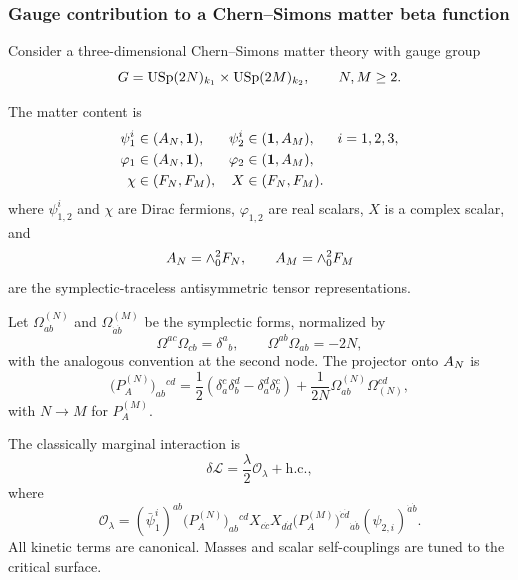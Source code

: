 \subsubsection{Gauge contribution to a Chern--Simons matter beta function}
\label{problem:chern-simons-beta-function}
Consider a three-dimensional Chern--Simons matter theory with gauge group
\begin{equation}
G=\operatorname{USp}(2N)_{k_1}\times \operatorname{USp}(2M)_{k_2},
\qquad N,M\geq 2.
\end{equation}

The matter content is
\begin{align}
\psi_1^i&\in(A_N,\mathbf{1}),
&\psi_2^i&\in(\mathbf{1},A_M),
&&i=1,2,3,\\
\varphi_1&\in(A_N,\mathbf{1}),
&\varphi_2&\in(\mathbf{1},A_M),\\
\chi&\in(F_N,F_M),
&X&\in(F_N,F_M).
\end{align}
where $\psi_{1,2}^i$ and $\chi$ are Dirac fermions, $\varphi_{1,2}$ are real scalars, $X$ is a complex scalar, and
\begin{equation}
A_N=\wedge_0^2F_N,
\qquad
A_M=\wedge_0^2F_M
\end{equation}
are the symplectic-traceless antisymmetric tensor representations.

Let $\Omega_{ab}^{(N)}$ and $\Omega_{\dot a\dot b}^{(M)}$ be the symplectic forms, normalized by
\begin{equation}
\Omega^{ac}\Omega_{cb}=\delta^a{}_b,
\qquad
\Omega^{ab}\Omega_{ab}=-2N,
\end{equation}
with the analogous convention at the second node. The projector onto $A_N$ is
\begin{equation}
\bigl(P_A^{(N)}\bigr)_{ab}{}^{cd}
=\frac12\left(\delta_a^c\delta_b^d-\delta_a^d\delta_b^c\right)
+\frac{1}{2N}\Omega_{ab}^{(N)}\Omega_{(N)}^{cd},
\end{equation}
with $N\to M$ for $P_A^{(M)}$.

The classically marginal interaction is
\begin{equation}
\delta\mathcal L=\frac{\lambda}{2}\mathcal O_\lambda+\text{h.c.},
\end{equation}
where
\begin{equation}
\mathcal O_\lambda
=(\bar\psi_1^i)^{ab}
\bigl(P_A^{(N)}\bigr)_{ab}{}^{cd}
X_{c\dot c}X_{d\dot d}
\bigl(P_A^{(M)}\bigr)^{\dot c\dot d}{}_{\dot a\dot b}
(\psi_{2,i})^{\dot a\dot b}.
\end{equation}
All kinetic terms are canonical. Masses and scalar self-couplings are tuned to the critical surface.


